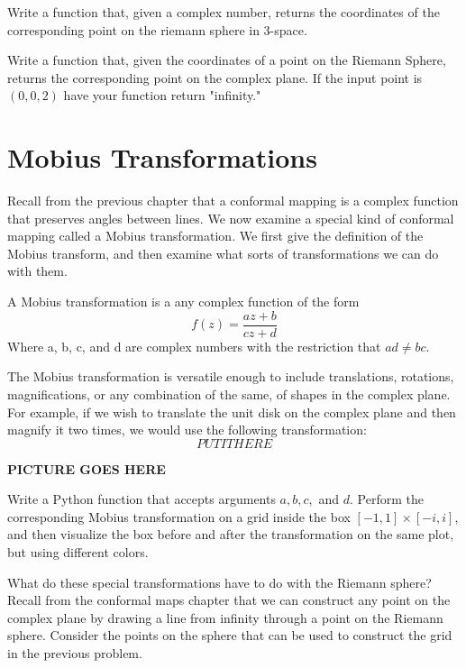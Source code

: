 \begin{problem}  Write a function that, given a complex number, returns the coordinates of the corresponding point on the riemann sphere in 3-space.
\end{problem}

\begin{problem}
Write a function that, given the coordinates of a point on the Riemann Sphere, returns the corresponding point on the complex plane. If the input point is $(0,0,2)$ have your function return "infinity."
\end{problem}

\section*{Mobius Transformations}

Recall from the previous chapter that a conformal mapping is a complex function that preserves angles between lines.  We now examine a special kind of conformal mapping called a Mobius transformation.  We first give the definition of the Mobius transform, and then examine what sorts of transformations we can do with them.

\begin{definition}  A Mobius transformation is a any complex function of the form
\[
f(z) = \frac{az + b}{cz + d}
\]
 Where a, b, c, and d are complex numbers with the restriction that $ad \neq bc$.
\end{definition}

The Mobius transformation is versatile enough to include translations, rotations, magnifications, or any combination of the same, of shapes in the complex plane.  For example, if we wish to translate the unit disk on the complex plane and then magnify it two times, we would use the following transformation:
\[
PUT IT HERE
\]

{\bf PICTURE GOES HERE}

\begin{problem} Write a Python function that accepts arguments $a,b,c,$ and $d$.  Perform the corresponding Mobius transformation on a grid inside the box $[-1,1]\times[-i,i]$, and then visualize the box before and after the transformation on the same plot, but using different colors.
\end{problem}

What do these special transformations have to do with the Riemann sphere?  Recall from the conformal maps chapter that we can construct any point on the complex plane by drawing a line from infinity through a point on the Riemann sphere.  Consider the points on the sphere that can be used to construct the grid in the previous problem.

